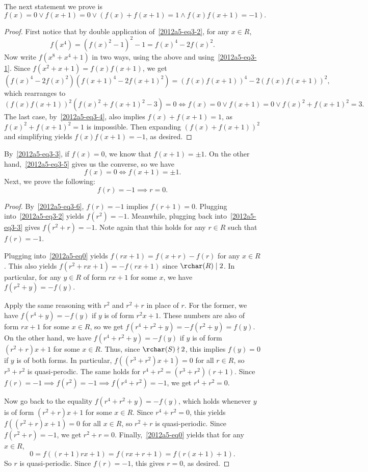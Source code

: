 The next statement we prove is
\[ f(x) = 0 \vee f(x + 1) = 0 \vee (f(x) + f(x + 1) = 1 \wedge f(x) f(x + 1) = -1). \tag{3.5}\label{2012a5-eq3-5} \]

\begin{proof}
First notice that by double application of~\eqref{2012a5-eq3-2}, for any $x \in R$,
\[ f(x^4) = (f(x)^2 - 1)^2 - 1 = f(x)^4 - 2 f(x)^2. \]
Now write $f(x^8 + x^4 + 1)$ in two ways, using the above and using~\eqref{2012a5-eq3-1}.
Since $f(x^2 + x + 1) = f(x) f(x + 1)$, we get
\[ (f(x)^4 - 2 f(x)^2)(f(x + 1)^4 - 2 f(x + 1)^2) = (f(x) f(x + 1))^4 - 2 (f(x) f(x + 1))^2, \]
    which rearranges to
\[ (f(x) f(x + 1))^2 (f(x)^2 + f(x + 1)^2 - 3) = 0 \iff f(x) = 0 \vee f(x + 1) = 0 \vee f(x)^2 + f(x + 1)^2 = 3. \]
The last case, by~\eqref{2012a5-eq3-4}, also implies $f(x) + f(x + 1) = 1$, as $f(x)^2 + f(x + 1)^2 = 1$ is impossible.
Then expanding $(f(x) + f(x + 1))^2$ and simplifying yields $f(x) f(x + 1) = -1$, as desired.
\end{proof}

By~\eqref{2012a5-eq3-3}, if $f(x) = 0$, we know that $f(x + 1) = \pm 1$.
On the other hand,~\eqref{2012a5-eq3-5} gives us the converse, so we have
\[ f(x) = 0 \iff f(x + 1) = \pm 1. \tag{3.6}\label{2012a5-eq3-6} \]
Next, we prove the following:
\[ f(r) = -1 \implies r = 0. \tag{3.7}\label{2012a5-eq3-7} \]

\begin{proof}
By~\eqref{2012a5-eq3-6}, $f(r) = -1$ implies $f(r + 1) = 0$.
Plugging into~\eqref{2012a5-eq3-2} yields $f(r^2) = -1$.
Meanwhile, plugging back into~\eqref{2012a5-eq3-3} gives $f(r^2 + r) = -1$.
Note again that this holds for any $r \in R$ such that $f(r) = -1$.

Plugging into~\eqref{2012a5-eq0} yields $f(rx + 1) = f(x + r) - f(r)$ for any $x \in R$.
This also yields $f(r^2 + rx + 1) = -f(rx + 1)$ since $\rchar(R) \mid 2$.
In particular, for any $y \in R$ of form $rx + 1$ for some $x$, we have $f(r^2 + y) = -f(y)$.

Apply the same reasoning with $r^2$ and $r^2 + r$ in place of $r$.
For the former, we have $f(r^4 + y) = -f(y)$ if $y$ is of form $r^2 x + 1$.
These numbers are also of form $rx + 1$ for some $x \in R$, so we get $f(r^4 + r^2 + y) = -f(r^2 + y) = f(y)$.
On the other hand, we have $f(r^4 + r^2 + y) = -f(y)$ if $y$ is of form $(r^2 + r) x + 1$ for some $x \in R$.
Thus, since $\rchar(S) \nmid 2$, this implies $f(y) = 0$ if $y$ is of both forms.
In particular, $f((r^3 + r^2) x + 1) = 0$ for all $r \in R$, so $r^3 + r^2$ is quasi-perodic.
The same holds for $r^4 + r^2 = (r^3 + r^2)(r + 1)$.
Since $f(r) = -1 \implies f(r^2) = -1 \implies f(r^4 + r^2) = -1$, we get $r^4 + r^2 = 0$.

Now go back to the equality $f(r^4 + r^2 + y) = -f(y)$, which holds whenever $y$ is of form $(r^2 + r) x + 1$ for some $x \in R$.
Since $r^4 + r^2 = 0$, this yields $f((r^2 + r) x + 1) = 0$ for all $x \in R$, so $r^2 + r$ is quasi-periodic.
Since $f(r^2 + r) = -1$, we get $r^2 + r = 0$.
Finally,~\eqref{2012a5-eq0} yields that for any $x \in R$,
\[ 0 = f((r + 1)rx + 1) = f(rx + r + 1) = f(r(x + 1) + 1). \]
So $r$ is quasi-periodic.
Since $f(r) = -1$, this gives $r = 0$, as desired.
\end{proof}

